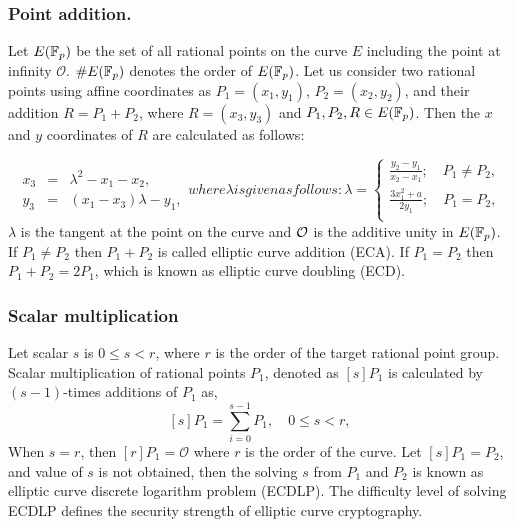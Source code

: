 \subsubsection{Point addition.}
Let $E({\mathbb{F}}_{p})$ be the set of all rational points on the curve $E$ including the point at infinity $\mathcal{O}$.
$\#E(\mathbb{F}_p)$ denotes the order of $E(\mathbb{F}_p)$.
Let us consider two rational points using affine coordinates as $P_1= (x_1, y_1)$, $P_2 = (x_2, y_2)$, and their addition $R = P_1 + P_2$, where $\textit{R} = (x_3, y_3)$ and $P_1, P_2, R \in E({\mathbb{F}}_{p})$. Then the $x$ and $y$ coordinates of $R$ are calculated as follows:

\begin{subequations}
\begin{eqnarray}\label{eq:point_add}
x_3 & = & \lambda^2-x_1-x_2 ,\\
 y_3 & = &(x_1-x_3)\lambda - y_1, 
\end{eqnarray}
where \mbox{$\lambda$} is given as follows:
\begin{equation}\label{eq:point_solpe}
\textstyle \lambda = 
\begin{cases}
 \textstyle \frac{y_2 - y_1}{ x_2 -x_1}; \quad \mbox{$P_1 \neq P_2$},\\
 \textstyle \frac{3x_1^2+a}{2y_1}; \quad  \mbox{$P_1 = P_2$},\\
\end{cases}
\end{equation}
\end{subequations}
$\lambda$ is the tangent at the point on the curve and $\cal O$ is the additive unity in $E({\mathbb{F}}_{p})$. If $P_1 \neq P_2$ then $P_1+P_2$ is called elliptic curve addition (ECA). If $P_1=P_2$ then $P_1+P_2=2P_1$, which is known as elliptic curve doubling (ECD). 

\subsubsection{Scalar multiplication}
Let scalar $s$ is $0 \leq s < r$, where $r$ is the order of the target rational point group. Scalar multiplication of rational points $P_1$, denoted as $[s]P_1$ is calculated by $(s-1)$-times additions of $P_1$ as,
\begin{equation}\label{scalar_mul}
[s]P_1 = \sum_{i=0}^{s-1} P_1, \quad \text{$0 \leq s < r$},
\end{equation}
When $s = r$, then $[r]P_1 = \mathcal{O}$ where $r$ is the order of the curve. Let $[s]P_1 = P_2$, and value of $s$ is not obtained, then the solving $s$ from $P_1$ and $P_2$ is known as elliptic curve discrete logarithm problem (ECDLP). The difficulty level of solving ECDLP defines the security strength of elliptic curve cryptography.

